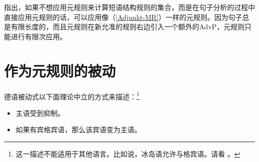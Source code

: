  \citet{WP92b}指出，如果不想应用元规则来计算短语结构规则的集合，而是在句子分析的过程中直接应用元规则的话，可以应用像（\ref{Adjunkt-MR}）一样的元规则。因为句子总是有限长度的，而且元规则在新允准的规则右边引入一个额外的AdvP，元规则只能进行有限次应用。

\section{作为元规则的被动}
\label{sec-passive-gpsg}

德语被动式以下面理论中立的方式来描述：\footnote{%
这一描述不能适用于其他语言。比如说，冰岛语允许与格宾语。请看 \citet*{ZMT85a}。
}
\begin{itemize}
\item 主语受到抑制。
\item 如果有宾格宾语，那么该宾语变为主语。
\end{itemize}

